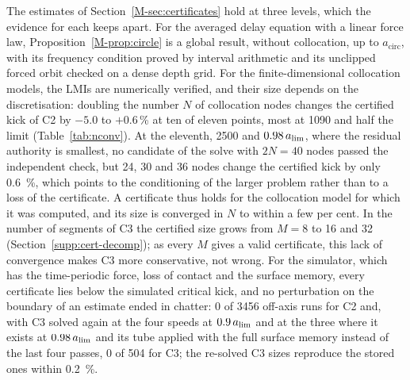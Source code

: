 The estimates of Section~\ref{M-sec:certificates} hold at three levels, which the evidence for each keeps apart. For the averaged delay equation with a linear force law, Proposition~\ref{M-prop:circle} is a global result, without collocation, up to $a_{\mathrm{circ}}$, with its frequency condition proved by interval arithmetic and its unclipped forced orbit checked on a dense depth grid. For the finite-dimensional collocation models, the LMIs are numerically verified, and their size depends on the discretisation: doubling the number $N$ of collocation nodes changes the certified kick of C2 by $-5.0$ to $+0.6$\,\% at ten of eleven points, most at \SI{1090}{\rpm} and half the limit (Table~\ref{tab:nconv}). At the eleventh, \SI{2500}{\rpm} and $0.98\,a_{\lim}$, where the residual authority is smallest, no candidate of the solve with $2N=40$ nodes passed the independent check, but 24, 30 and 36 nodes change the certified kick by only \SI{0.6}{\percent}, which points to the conditioning of the larger problem rather than to a loss of the certificate. A certificate thus holds for the collocation model for which it was computed, and its size is converged in $N$ to within a few per cent. In the number of segments of C3 the certified size grows from $M=8$ to 16 and 32 (Section~\ref{supp:cert-decomp}); as every $M$ gives a valid certificate, this lack of convergence makes C3 more conservative, not wrong. For the simulator, which has the time-periodic force, loss of contact and the surface memory, every certificate lies below the simulated critical kick, and no perturbation on the boundary of an estimate ended in chatter: 0 of 3456 off-axis runs for C2 and, with C3 solved again at the four speeds at $0.9\,a_{\lim}$ and at the three where it exists at $0.98\,a_{\lim}$ and its tube applied with the full surface memory instead of the last four passes, 0 of 504 for C3; the re-solved C3 sizes reproduce the stored ones within \SI{0.2}{\percent}.
